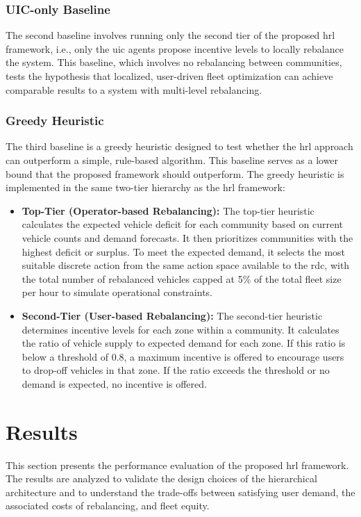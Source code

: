 \subsubsection{UIC-only Baseline}
The second baseline involves running only the second tier of the proposed \gls{hrl} framework, i.e., only the \gls{uic} agents propose incentive levels to locally rebalance the system.
This baseline, which involves no rebalancing between communities, tests the hypothesis that localized, user-driven fleet optimization can achieve comparable results to a system with multi-level rebalancing.

\subsubsection{Greedy Heuristic}
The third baseline is a greedy heuristic designed to test whether the \gls{hrl} approach can outperform a simple, rule-based algorithm. This baseline serves as a lower bound that the proposed framework should outperform. The greedy heuristic is implemented in the same two-tier hierarchy as the \gls{hrl} framework:

\begin{itemize}
    \item \textbf{Top-Tier (Operator-based Rebalancing):}
        The top-tier heuristic calculates the expected vehicle deficit for each community based on current vehicle counts and demand forecasts.
        It then prioritizes communities with the highest deficit or surplus.
        To meet the expected demand, it selects the most suitable discrete action from the same action space available to the \gls{rdc}, with the total number of rebalanced vehicles capped at 5\% of the total fleet size per hour to simulate operational constraints.

    \item \textbf{Second-Tier (User-based Rebalancing):}
        The second-tier heuristic determines incentive levels for each zone within a community.
        It calculates the ratio of vehicle supply to expected demand for each zone.
        If this ratio is below a threshold of 0.8, a maximum incentive is offered to encourage users to drop-off vehicles in that zone.
        If the ratio exceeds the threshold or no demand is expected, no incentive is offered.
\end{itemize}

\section{Results}
This section presents the performance evaluation of the proposed \gls{hrl} framework.
The results are analyzed to validate the design choices of the hierarchical architecture and to understand the trade-offs between satisfying user demand, the associated costs of rebalancing, and fleet equity.


